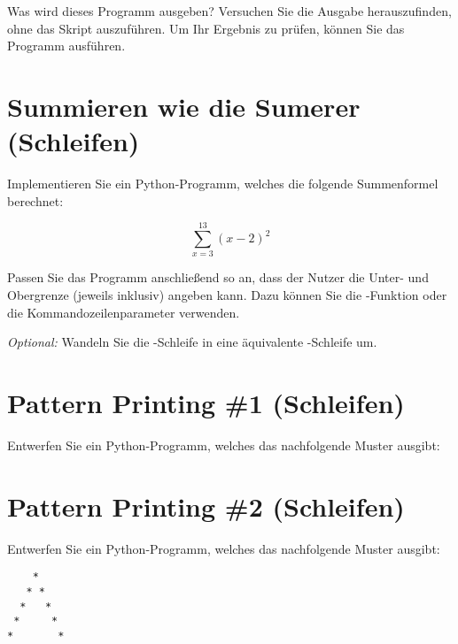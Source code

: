 Was wird dieses Programm ausgeben? Versuchen Sie die Ausgabe herauszufinden, ohne das Skript auszuführen. Um Ihr Ergebnis zu prüfen, können Sie das Programm  ausführen.


\section{Summieren wie die Sumerer \small{(Schleifen)}}

Implementieren Sie ein Python-Programm, welches die folgende Summenformel berechnet:

$$\sum_{x=3}^{13}(x-2)^2$$

Passen Sie das Programm anschließend so an, dass der Nutzer die Unter- und Obergrenze (jeweils inklusiv) angeben kann. Dazu können Sie die -Funktion oder die Kommandozeilenparameter verwenden. 

\textit{Optional:} Wandeln Sie die -Schleife in eine äquivalente -Schleife um.



\section{Pattern Printing \#1 \small{(Schleifen)}}

Entwerfen Sie ein Python-Programm, welches das nachfolgende Muster ausgibt: 




\section{Pattern Printing \#2 \small{(Schleifen)}}

Entwerfen Sie ein Python-Programm, welches das nachfolgende Muster ausgibt: 

\begin{lstlisting}
    *
   * *
  *   *
 *     *
*       *
\end{lstlisting}


